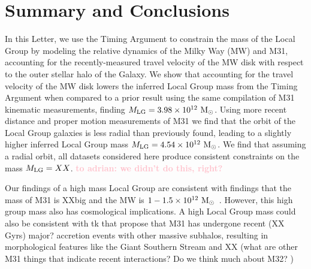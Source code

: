 \documentclass[twocolumn]{aastex631}
\newcommand{\kc}[1]{\textcolor{pink}{\textbf{#1}} }
\newcommand{\mlg}{\ensuremath{M_{\rm LG}}}
\begin{document}


\section{Summary and Conclusions}
\label{sec:summary}
In this Letter, we use the Timing Argument to constrain the mass of the Local
Group by modeling the relative dynamics of the Milky Way (MW) and M31,
accounting for the recently-measured travel velocity of the MW disk with respect
to the outer stellar halo of the Galaxy.
We show that accounting for the travel velocity of the MW disk lowers the
inferred Local Group mass from the Timing Argument when compared to a prior
result using the same compilation of M31 kinematic measurements, finding $\mlg =
3.98\times 10^{12}~\Msun$.
Using more recent distance and proper motion measurements of M31 we find that
the orbit of the Local Group galaxies is less radial than previously found,
leading to a slightly higher inferred Local Group mass $\mlg = 4.54\times10^{12}~\Msun$.
We find that assuming a radial orbit, all datasets considered here produce
consistent constraints on the mass $\mlg = XX$. \kc{to adrian: we didn't do this, right?}

Our findings of a high mass Local Group are consistent with findings that the
mass of M31 is XXbig and the MW is $1-1.5\times10^{12}~\mathrm{M}_\odot$~\citep{??}.
However, this high group mass also has cosmological implications.
A high Local Group mass could also be consistent with tk that propose that M31
has undergone recent (XX Gyrs) major? accretion events with other massive
subhalos, resulting in morphological features like the Giant Southern Stream and
XX (what are other M31 things that indicate recent interactions? Do we think
much about M32? )
\end{document}

